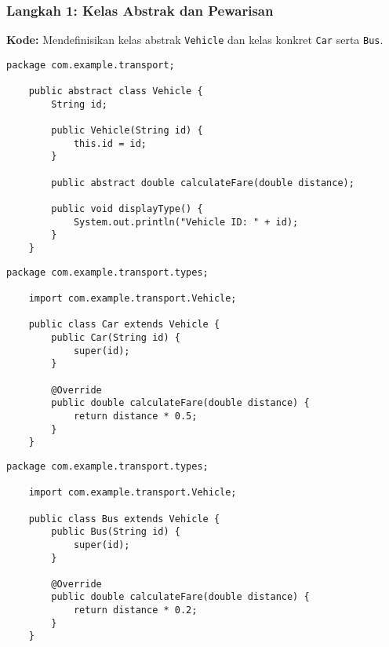 \subsubsection{Langkah 1: Kelas Abstrak dan Pewarisan}

\textbf{Kode:} Mendefinisikan kelas abstrak \texttt{Vehicle} dan kelas konkret \texttt{Car} serta \texttt{Bus}.

\begin{lstlisting}[style=JavaStyle, caption={Vehicle.java}]
	package com.example.transport;
	
	public abstract class Vehicle {
		String id;
		
		public Vehicle(String id) {
			this.id = id;
		}
		
		public abstract double calculateFare(double distance);
		
		public void displayType() {
			System.out.println("Vehicle ID: " + id);
		}
	}
\end{lstlisting}

\begin{lstlisting}[style=JavaStyle, caption={Car.java}]
	package com.example.transport.types;
	
	import com.example.transport.Vehicle;
	
	public class Car extends Vehicle {
		public Car(String id) {
			super(id);
		}
		
		@Override
		public double calculateFare(double distance) {
			return distance * 0.5;
		}
	}
\end{lstlisting}

\begin{lstlisting}[style=JavaStyle, caption={Bus.java}]
	package com.example.transport.types;
	
	import com.example.transport.Vehicle;
	
	public class Bus extends Vehicle {
		public Bus(String id) {
			super(id);
		}
		
		@Override
		public double calculateFare(double distance) {
			return distance * 0.2;
		}
	}
\end{lstlisting}

